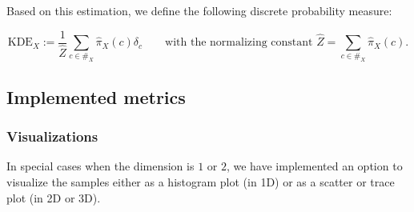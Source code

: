 \noindent Based on this estimation, we define the following discrete probability measure:

\[ \text{KDE}_X := \frac 1 {\hat Z} \sum_{c \in \#_X} \hat{\pi}_X(c) \delta_c \qquad \text{with the normalizing constant } \hat Z = \sum_{c \in \#_X} \hat{\pi}_X(c).\]

\subsection{Implemented metrics}

\subsubsection{Visualizations}
In special cases when the dimension is $1$ or $2$, we have implemented an option to visualize the samples either as a histogram plot (in 1D) or as a scatter or trace plot (in 2D or 3D).


